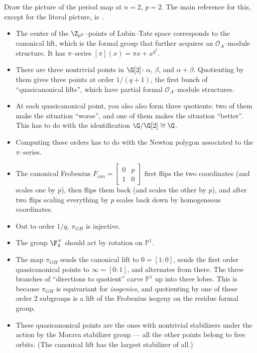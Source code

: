 Draw the picture of the period map at $n = 2$, $p = 2$.  The main reference for this, except for the literal picture, is~\cite[Appendix 25]{HopkinsGrossEquivVBs}.
\begin{itemize}
\item The center of the $\Z_{p^2}$--points of Lubin--Tate space corresponds to the canonical lift, which is the formal group that further acquires an $\mathcal O_A$--module structure.  It has $\pi$--series $[\pi](x) = \pi x + x^{q^2}$.
\item There are three nontrivial points in $\G[2]$: $\alpha$, $\beta$, and $\alpha + \beta$.  Quotienting by them gives three points at order $1/(q+1)$, the first bunch of ``quasicanonical lifts'', which have partial formal $\mathcal O_A$--module structures.
\item At each quasicanonical point, you also also form three quotients: two of them make the situation ``worse'', and one of them makes the situation ``better''.  This has to do with the identification $\G / \G[2] \cong \G$.
\item Computing these orders has to do with the Newton polygon associated to the $\pi$--series.
\item The canonical Frobenius $F_{can} = \left[ \begin{array}{cc} 0 & p \\ 1 & 0 \end{array} \right]$ first flips the two coordinates (and scales one by $p$), then flips them back (and scales the other by $p$), and after two flips scaling everything by $p$ scales back down by homogeneous coordinates.
\item Out to order $1/q$, $\pi_{GH}$ is injective.
\item The group $\F_4^\times$ should act by rotation on $\mathbb P^1$.
\item The map $\pi_{GH}$ sends the canonical lift to $0 = [1:0]$, sends the first order quasicanonical points to $\infty = [0:1]$, and alternates from there.  The three branches of ``directions to quotient'' carve $\mathbb P^1$ up into three lobes.  This is because $\pi_{GH}$ is equivariant for \emph{isogenies}, and quotienting by one of these order $2$ subgroups is a lift of the Frobenius isogeny on the residue formal group.
\item These quasicanonical points are the ones with nontrivial stabilizers under the action by the Morava stabilizer group --- all the other points belong to free orbits.  (The canonical lift has the largest stabilizer of all.)
\end{itemize}


